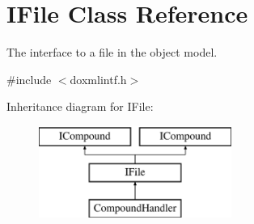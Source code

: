 \hypertarget{class_i_file}{}\section{I\+File Class Reference}
\label{class_i_file}


The interface to a file in the object model.  




{\ttfamily \#include $<$doxmlintf.\+h$>$}

Inheritance diagram for I\+File\+:\begin{figure}[H]
\begin{center}
\leavevmode
\includegraphics[height=3.000000cm]{class_i_file}
\end{center}
\end{figure}
